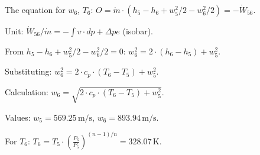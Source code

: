 The equation for \( w_6 \), \( T_6 \):  
\( O = \dot{m} \cdot (h_5 - h_6 + w_5^2 / 2 - w_6^2 / 2) = -\dot{W}_{56} \).  

Unit: \( \dot{W}_{56} / \dot{m} = - \int v \cdot dp + \Delta pe \) (isobar).  

From \( h_5 - h_6 + w_5^2 / 2 - w_6^2 / 2 = 0 \):  
\( w_6^2 = 2 \cdot (h_6 - h_5) + w_5^2 \).  

Substituting:  
\( w_6^2 = 2 \cdot c_p \cdot (T_6 - T_5) + w_5^2 \).  

Calculation:  
\( w_6 = \sqrt{2 \cdot c_p \cdot (T_6 - T_5) + w_5^2} \).  

Values:  
\( w_5 = 569.25 \, \text{m/s} \), \( w_6 = 893.94 \, \text{m/s} \).  

For \( T_6 \):  
\( T_6 = T_5 \cdot \left( \frac{P_6}{P_5} \right)^{(n-1)/n} = 328.07 \, \text{K} \).